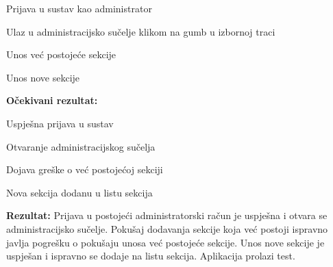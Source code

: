			 \begin{packed_enum}
			 	\item {Prijava u sustav kao administrator}
			 	\item {Ulaz u administracijsko sučelje klikom na gumb u izbornoj traci}
			 	\item {Unos već postojeće sekcije}
			 	\item {Unos nove sekcije}
			 \end{packed_enum}

			 \textbf{Očekivani rezultat:}

			 \begin{packed_enum}
			 	\item {Uspješna prijava u sustav}
			 	\item {Otvaranje administracijskog sučelja}
			 	\item {Dojava greške o već postojećoj sekciji}
			 	\item {Nova sekcija dodanu u listu sekcija}
			 \end{packed_enum}

			 \textbf{Rezultat: }Prijava u postojeći administratorski račun je uspješna i otvara se administracijsko sučelje. Pokušaj dodavanja sekcije koja već postoji ispravno javlja pogrešku o pokušaju unosa već postojeće sekcije. Unos nove sekcije je uspješan i ispravno se dodaje na listu sekcija. {\color{green} Aplikacija prolazi test.}
			 
